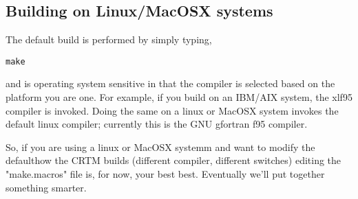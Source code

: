 \subsection{Building on Linux/MacOSX systems}
The default build is performed by simply typing,

\quad\texttt{make}

and is operating system sensitive in that the compiler is selected based on the platform you are one. For example, if you build on an IBM/AIX system, the xlf95 compiler is invoked. Doing the same on a linux or MacOSX system invokes the default linux compiler; currently this is the GNU gfortran f95 compiler.

So, if you are using a linux or MacOSX systemm and want to modify the defaulthow the CRTM builds (different compiler, different switches) editing the "make.macros" file is, for now, your best best. Eventually we'll put together something smarter.

%
%
%
%
%
%
%
%
%
%

